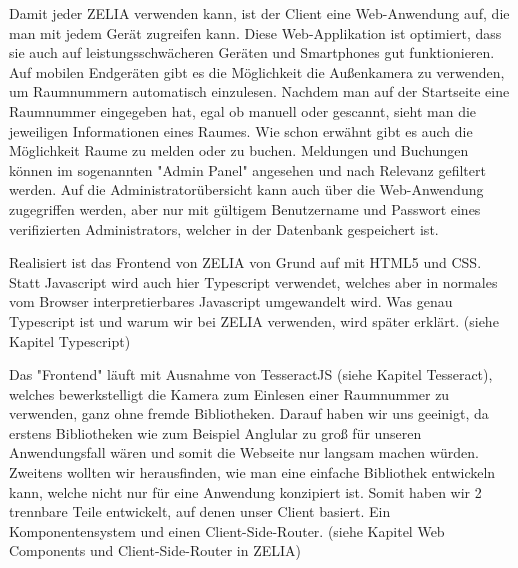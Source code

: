 
Damit jeder ZELIA verwenden kann, ist der Client eine Web-Anwendung auf, die man mit jedem Gerät zugreifen kann. Diese Web-Applikation ist optimiert, dass sie auch auf leistungsschwächeren Geräten und Smartphones gut funktionieren. Auf mobilen Endgeräten gibt es die Möglichkeit die Außenkamera zu verwenden, um Raumnummern automatisch einzulesen. Nachdem man auf der Startseite eine Raumnummer eingegeben hat, egal ob manuell oder gescannt, sieht man die jeweiligen Informationen eines Raumes. Wie schon erwähnt gibt es auch die Möglichkeit Raume zu melden oder zu buchen. Meldungen und Buchungen können im sogenannten "Admin Panel" angesehen und nach Relevanz gefiltert werden. Auf die Administratorübersicht kann auch über die Web-Anwendung zugegriffen werden, aber nur mit gültigem Benutzername und Passwort eines verifizierten Administrators, welcher in der Datenbank gespeichert ist.

Realisiert ist das Frontend von ZELIA von Grund auf mit HTML5 und CSS. Statt Javascript wird auch hier Typescript verwendet, welches aber in normales vom Browser interpretierbares Javascript umgewandelt wird. Was genau Typescript ist und warum wir bei ZELIA verwenden, wird später erklärt. (siehe Kapitel Typescript)

Das "Frontend" läuft mit Ausnahme von TesseractJS (siehe Kapitel Tesseract), welches bewerkstelligt die Kamera zum Einlesen einer Raumnummer zu verwenden, ganz ohne fremde Bibliotheken. Darauf haben wir uns geeinigt, da erstens Bibliotheken wie zum Beispiel Anglular zu groß für unseren Anwendungsfall wären und somit die Webseite nur langsam machen würden. Zweitens wollten wir herausfinden, wie man eine einfache Bibliothek entwickeln kann, welche nicht nur für eine Anwendung konzipiert ist. Somit haben wir 2 trennbare Teile entwickelt, auf denen unser Client basiert. Ein Komponentensystem und einen Client-Side-Router. (siehe Kapitel Web Components und Client-Side-Router in ZELIA)